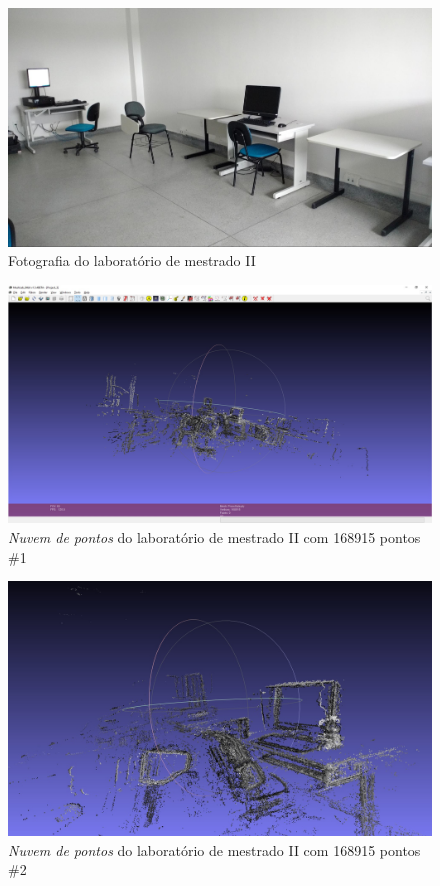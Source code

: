 \begin{figure}[H]
	\centering
		\includegraphics[width= \textwidth]{Imagens/figura4-15.jpg}
	\caption{Fotografia do laboratório de mestrado II}
	\label{fig4:15}
\end{figure}

\begin{figure}[H]
	\centering
		\includegraphics[width= \textwidth]{Imagens/figura4-13.jpg}
	\caption{\textit{Nuvem de pontos} do laboratório de mestrado II com 168915 pontos \#1}
	\label{fig4:13}
\end{figure}

\begin{figure}[H]
	\centering
		\includegraphics[width= \textwidth]{Imagens/figura4-14.jpg}
	\caption{\textit{Nuvem de pontos} do laboratório de mestrado II com 168915 pontos \#2}
	\label{fig4:14}
\end{figure}


